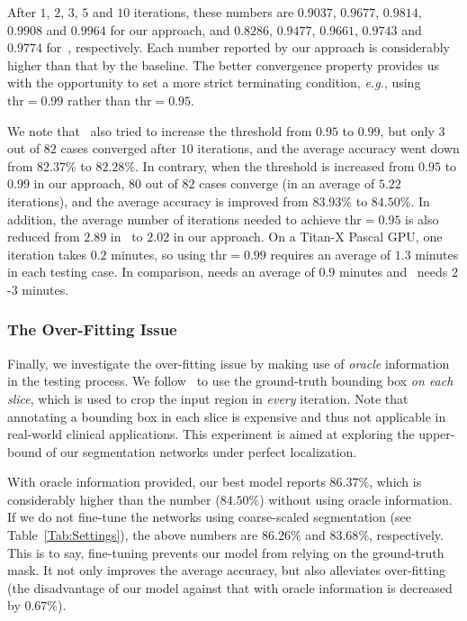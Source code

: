 \documentclass[10pt,twocolumn,letterpaper]{article}
\begin{document}
After $1$, $2$, $3$, $5$ and $10$ iterations, these numbers are $0.9037$, $0.9677$, $0.9814$, $0.9908$ and $0.9964$ for our approach,
and $0.8286$, $0.9477$, $0.9661$, $0.9743$ and $0.9774$ for~\cite{Zhou_2017_Fixed}, respectively.
Each number reported by our approach is considerably higher than that by the baseline.
The better convergence property provides us with the opportunity to set a more strict terminating condition,
{\em e.g.}, using ${\mathrm{thr}}={0.99}$ rather than ${\mathrm{thr}}={0.95}$.

We note that~\cite{Zhou_2017_Fixed} also tried to increase the threshold from $0.95$ to $0.99$,
but only $3$ out of $82$ cases converged after $10$ iterations, and the average accuracy went down from $82.37\%$ to $82.28\%$.
In contrary, when the threshold is increased from $0.95$ to $0.99$ in our approach,
$80$ out of $82$ cases converge (in an average of $5.22$ iterations),
and the average accuracy is improved from $83.93\%$ to $84.50\%$.
In addition, the average number of iterations needed to achieve ${\mathrm{thr}}={0.95}$
is also reduced from $2.89$ in~\cite{Zhou_2017_Fixed} to $2.02$ in our approach.
On a Titan-X Pascal GPU, one iteration takes $0.2$ minutes,
so using ${\mathrm{thr}}={0.99}$ requires an average of $1.3$ minutes in each testing case.
In comparison, \cite{Zhou_2017_Fixed} needs an average of $0.9$ minutes and~\cite{Roth_2016_Spatial} needs $2$-$3$ minutes.


\vspace{-0.2cm}
\subsubsection{The Over-Fitting Issue}
\label{ExperimentsNIH:Diagnosis:OverFitting}

Finally, we investigate the over-fitting issue by making use of {\em oracle} information in the testing process.
We follow~\cite{Zhou_2017_Fixed} to use the ground-truth bounding box {\em on each slice},
which is used to crop the input region in {\em every} iteration.
Note that annotating a bounding box in each slice is expensive and thus not applicable in real-world clinical applications.
This experiment is aimed at exploring the upper-bound of our segmentation networks under perfect localization.

With oracle information provided, our best model reports $86.37\%$,
which is considerably higher than the number ($84.50\%$) without using oracle information.
If we do not fine-tune the networks using coarse-scaled segmentation (see Table~\ref{Tab:Settings}),
the above numbers are $86.26\%$ and $83.68\%$, respectively.
This is to say, fine-tuning prevents our model from relying on the ground-truth mask.
It not only improves the average accuracy,
but also alleviates over-fitting (the disadvantage of our model against that with oracle information is decreased by $0.67\%$).
\end{document}
